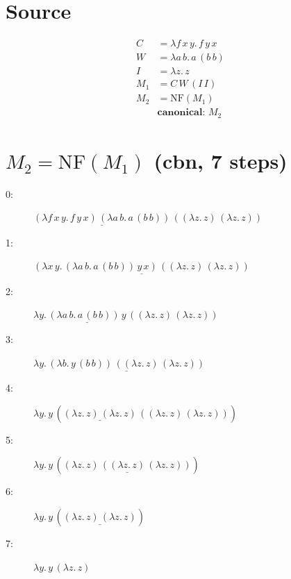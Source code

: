 \documentclass[a4paper,landscape]{article}
\begin{document}
\section*{Source}
\begin{align*}
C &= \lambda f\,x\,y.\,f\,y\,x \\
W &= \lambda a\,b.\,a\,(b\,b) \\
I &= \lambda z.\,z \\
M_{1} &= C\,W\,(I\,I) \\
M_{2} &= \mathrm{NF}(M_{1}) \\
&\textbf{canonical: } M_{2}
\end{align*}

\section*{$M_{2} = \mathrm{NF}(M_{1})$ \quad \normalsize(cbn, 7 steps)}
\begin{description}
  \item[0:] $\underline{(\lambda f\,x\,y.\,f\,y\,x)\,(\lambda a\,b.\,a\,(b\,b))}\,((\lambda z.\,z)\,(\lambda z.\,z))$
  \item[1:] $\underline{(\lambda x\,y.\,(\lambda a\,b.\,a\,(b\,b))\,y\,x)\,((\lambda z.\,z)\,(\lambda z.\,z))}$
  \item[2:] $\lambda y.\,\underline{(\lambda a\,b.\,a\,(b\,b))\,y}\,((\lambda z.\,z)\,(\lambda z.\,z))$
  \item[3:] $\lambda y.\,\underline{(\lambda b.\,y\,(b\,b))\,((\lambda z.\,z)\,(\lambda z.\,z))}$
  \item[4:] $\lambda y.\,y\,(\underline{(\lambda z.\,z)\,(\lambda z.\,z)}\,((\lambda z.\,z)\,(\lambda z.\,z)))$
  \item[5:] $\lambda y.\,y\,(\underline{(\lambda z.\,z)\,((\lambda z.\,z)\,(\lambda z.\,z))})$
  \item[6:] $\lambda y.\,y\,(\underline{(\lambda z.\,z)\,(\lambda z.\,z)})$
  \item[7:] $\lambda y.\,y\,(\lambda z.\,z)$
\end{description}
\end{document}
